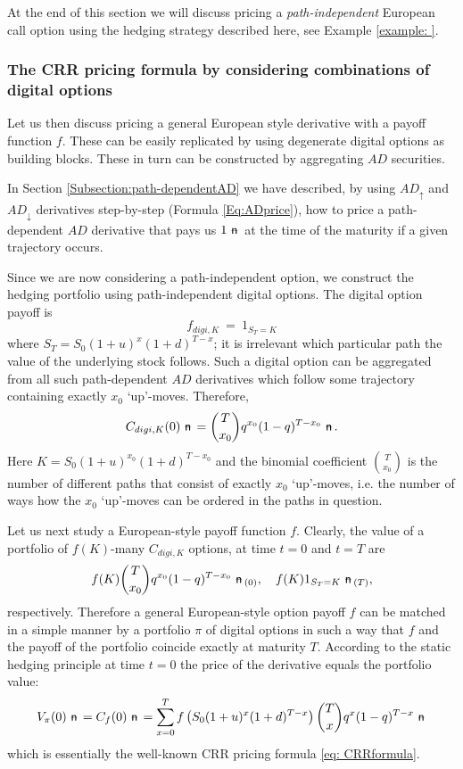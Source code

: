 \documentclass{amsart}
\theoremstyle{definition}
\theoremstyle{remark}
\newcommand{\n}{\!\!\ \nn \!\!\ }
\def\nn{\mathrel{%
    \mathchoice{\n}{\n}{\scriptsize\n}{\tiny\n}%
}}
\def\n {{%
    \setbox0\hbox{ \textsf{n}\!\  }%
    \rlap{\hbox to \wd0{\hss \!\ --\hss}}\box0
}}
\numberwithin{equation}{section}
\newcommand{\1}{\boldsymbol{1}}
\newcommand{\ua}{\uparrow}
\newcommand{\da}{\downarrow}
\begin{document}
 
At the end of this section we will discuss pricing a \emph{path-independent} European call option using the hedging strategy described here, see Example \ref{example: }.





\subsubsection{The CRR pricing formula by considering combinations of digital options} 

Let us then discuss pricing a general European style derivative with a payoff function $f$. 
These can be easily replicated by using degenerate digital options as building blocks. These in turn can be 
constructed by aggregating $AD$ securities.

In Section \ref{Subsection:path-dependentAD} we have described, by using $AD_{\ua}$ and $AD_{\da}$ derivatives 
step-by-step (Formula \eqref{Eq:ADprice}), how to price a path-dependent $AD$ derivative that pays us $1\n$ at the time of the maturity if a given trajectory occurs.

Since we are now considering a path-independent option, we construct the hedging portfolio using path-independent digital options. The digital option payoff is 
\[f_{digi, K}\ =\ 1_{S_T=K} \]
where $S_T=S_0(1+u)^x(1+d)^{T-x}$; it is irrelevant which particular path the value of the underlying stock follows. Such a digital option can be aggregated from all such path-dependent $AD$ derivatives which follow some trajectory containing exactly $x_0$ `up'-moves. Therefore, 
\begin{equation}\label{eq: Cdigi}
C_{digi, K}(0) \n =\binom{T}{x_0 }q^{x_0} (1-q)^{T-x_{0}} \n.
\end{equation}
Here $K=S_0 (1+u)^{x_0} (1+d)^{T-x_0 }$ and the binomial coefficient $\binom{T}{x_0 }$ is the number of different paths that consist of exactly $x_0$ `up'-moves, i.e. the number of ways how the $x_0$ `up'-moves can be ordered in the paths in question. 

Let us next study a European-style payoff function $f$.
Clearly, the value of a portfolio of $f(K)$-many $C_{digi, K}$ options,  
at time $t=0$ and $t=T$ are
\[
f(K)\binom{T}{x_0 }q^{x_0} (1-q)^{T-x_{0}}\n_{(0)},\quad f(K)1_{S_T=K}\n_{(T)},
\]
respectively. Therefore a general European-style option payoff $f$ can be matched in a simple manner
by a portfolio $\pi$ of digital options in such a way that $f$ and the payoff of the portfolio coincide exactly at maturity $T$.
According to the static hedging principle at time $t=0$ the price of the derivative equals the portfolio value:  
\[
  V_\pi  (0) \n = C_f(0) \n =\sum_{x=0}^{T}f\left(S_0 (1+u)^x (1+d)^{T-x} \right)\binom{T}{x}q^x (1-q)^{T-x} \n
\]
which is essentially the well-known CRR pricing formula \eqref{eq: CRRformula}.
\end{document}
